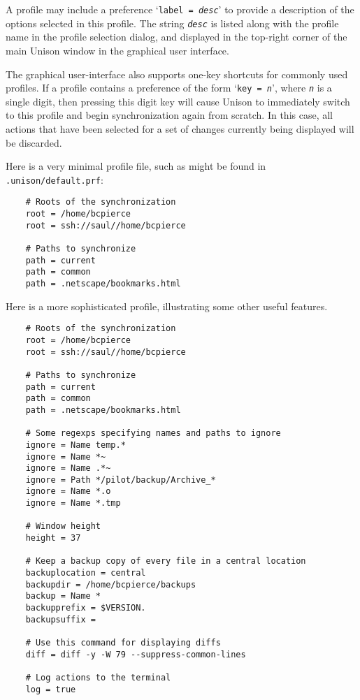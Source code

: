 \documentclass{article}
\newcommand{\ARG}[1]{\texttt{\textit{#1}}}
\begin{document}
A profile may include a preference `\texttt{label = \ARG{desc}}' to
provide a description of the options selected in this profile.  The
string \ARG{desc} is listed along with the profile name in the profile
selection dialog, and displayed in the top-right corner of the main
Unison window in the graphical user interface.

The graphical user-interface also supports one-key shortcuts for commonly
used profiles.  If a profile contains a preference of the form
%
`\texttt{key = \ARG{n}}', where \ARG{n} is a single digit, then
pressing this digit key will cause Unison to immediately switch to
this profile and begin synchronization again from scratch.  In this
case, all actions that have been selected for a set of changes
currently being displayed will be discarded.




Here is a very minimal profile file, such as might be found in {\tt
  .unison/default.prf}:
\begin{verbatim}
    # Roots of the synchronization
    root = /home/bcpierce
    root = ssh://saul//home/bcpierce

    # Paths to synchronize
    path = current
    path = common
    path = .netscape/bookmarks.html
\end{verbatim}


Here is a more sophisticated profile, illustrating some other useful
features.
\begin{verbatim}
    # Roots of the synchronization
    root = /home/bcpierce
    root = ssh://saul//home/bcpierce

    # Paths to synchronize
    path = current
    path = common
    path = .netscape/bookmarks.html

    # Some regexps specifying names and paths to ignore
    ignore = Name temp.*
    ignore = Name *~
    ignore = Name .*~
    ignore = Path */pilot/backup/Archive_*
    ignore = Name *.o
    ignore = Name *.tmp

    # Window height
    height = 37

    # Keep a backup copy of every file in a central location
    backuplocation = central
    backupdir = /home/bcpierce/backups
    backup = Name *
    backupprefix = $VERSION.
    backupsuffix =

    # Use this command for displaying diffs
    diff = diff -y -W 79 --suppress-common-lines

    # Log actions to the terminal
    log = true
\end{verbatim}
\end{document}
